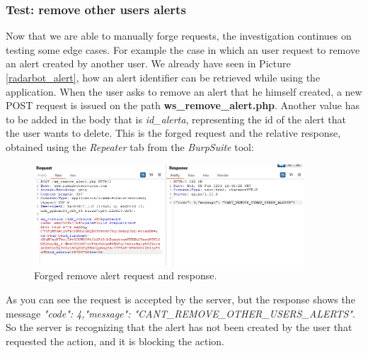 		\subsubsection{Test: remove other users alerts}
			\par Now that we are able to manually forge requests, the investigation continues on testing some edge cases. For example the case in which an user request to remove an alert created by another user. We already have seen in Picture \ref{radarbot_alert}, how an alert identifier can be retrieved while using the application. \newline
			When the user asks to remove an alert that he himself created, a new POST request is issued on the path \textbf{ws\_remove\_alert.php}. Another value has to be added in the body that is \textit{id\_alerta}, representing the id of the alert that the user wants to delete. This is the forged request and the relative response, obtained using the \textit{Repeater} tab from the \textit{BurpSuite} tool:
			\begin{figure}[ht]
				\centering
				\includegraphics[width=0.9\textwidth]{images/radarbot_removealert.png}
				\caption{Forged remove alert request and response.}
			\end{figure}
			\par As you can see the request is accepted by the server, but the response shows the message \textit
{"code": 4,"message": "CANT\_REMOVE\_OTHER\_USERS\_ALERTS"}. So the server is recognizing that the alert has not been created by the user that requested the action, and it is blocking the action.


